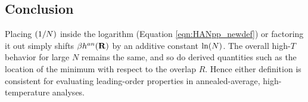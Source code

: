 \documentclass[11pt]{article}
\begin{document}
\subsection{Conclusion}
Placing \((1/N)\) inside the logarithm (Equation \eqref{eqn:HANpp_newdef}) or factoring it out simply shifts \(\beta h^{an}(\mathbf{R})\) by an additive constant \(\ln(N)\). The overall high-\(T\) behavior for large \(N\) remains the same, and so do derived quantities such as the location of the minimum with respect to the overlap \(R\). Hence either definition is consistent for evaluating leading-order properties in annealed-average, high-temperature analyses.
\end{document}
